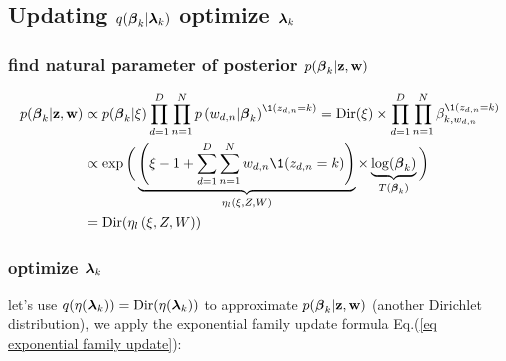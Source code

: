 \documentclass{article}
\begin{document}

\subsection{Updating $q(\boldsymbol{\beta}_{k} | \boldsymbol{\lambda}_k)$ optimize $\boldsymbol{\lambda}_k$}


\subsubsection{find natural parameter of posterior $p( \boldsymbol{\beta}_{k} | {\mathbf z}, {\mathbf w} )$}

\begin{equation}\begin{split}
p( \bbeta_{k} | \z, \w ) &\propto p(\bbeta_k | \xi) \prod_{d=1}^D \prod_{n=1}^N  p \left(w_{d,n} | \bbeta_{k}\right)^{ \1(z_{d,n}= k)}
= \text{Dir} (\xi) \times  \prod_{d=1}^D \prod_{n=1}^N \beta_{k,w_{d,n}}^{\1(z_{d,n}= k) } \\
&\propto \exp\bigg( \underbrace{\left(   \xi - 1 +  \sum_{d=1}^D \sum_{n=1}^N  w_{d,n}  \1(z_{d,n}= k)    \right)}_{\eta_l \left(\xi,  Z, W \right)}  \times \underbrace{\log(\bbeta_k)}_{T(\bbeta_{k})}\bigg)\\
&=\text{Dir}(\eta_l \left(\xi,  Z, W \right))
\end{split}\end{equation}





\subsubsection{optimize $\boldsymbol{\lambda}_k$}

let's use $q(\eta(\boldsymbol{\lambda}_k)) = \text{Dir}(\eta(\boldsymbol{\lambda}_k))$ to approximate $p( \boldsymbol{\beta}_{k} | {\mathbf z}, {\mathbf w} )$ (another Dirichlet distribution), we apply the exponential family update formula Eq.(\ref{eq exponential family update}):
\end{document}
